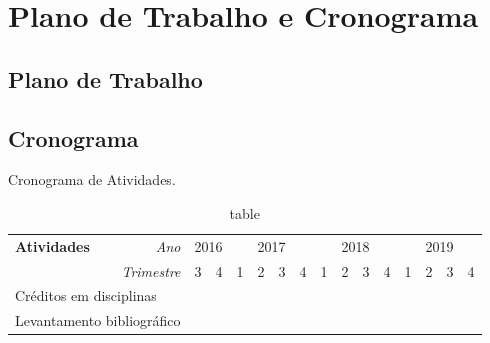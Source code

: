\chapter{Plano de Trabalho e Cronograma}

\section*{Plano de Trabalho}

\section*{Cronograma}


\begin{table}[h]
  \centering
	\caption{table}{Cronograma de Atividades.}
	\begin{tabular}{|l|r||l|l||l|l|l|l||l|l|l|l||l|l|l|l|}
		\hline
		\multirow{2}{*}{\textbf{Atividades}} &\footnotesize\textit{Ano}\normalsize & \multicolumn{2}{c||}{2016} & \multicolumn{4}{c||}{2017} & \multicolumn{4}{c||}{2018} & \multicolumn{4}{c|}{2019} \\
		\cline{2-16}
		&\footnotesize \textit{Trimestre}\footnotesize & \scriptsize 3 &\scriptsize 4 &\scriptsize 1 &\scriptsize 2 &\scriptsize 3 &\scriptsize 4 &\scriptsize 1 &\scriptsize 2 &\scriptsize 3 &\scriptsize 4 &\scriptsize 1 &\scriptsize 2 &\scriptsize 3 &\scriptsize 4 \\
		\hline \hline 
	  \multicolumn{2}{|l||}{\footnotesize Créditos em disciplinas} & \cellcolor{gray} & \cellcolor{gray} &  &  & \cellcolor{gray} & \cellcolor{gray} &  &  &  &  &  &  &  & \\
		\hline
		\multicolumn{2}{|l||}{\footnotesize Levantamento bibliográfico} & \cellcolor{gray} & \cellcolor{gray} & \cellcolor{gray} & \cellcolor{gray}  & \cellcolor{gray} & \cellcolor{gray} &  &  &  &  &  &  &  &  \\
		\hline
	\end{tabular}
	\label{tab:cronograma}
\end{table}